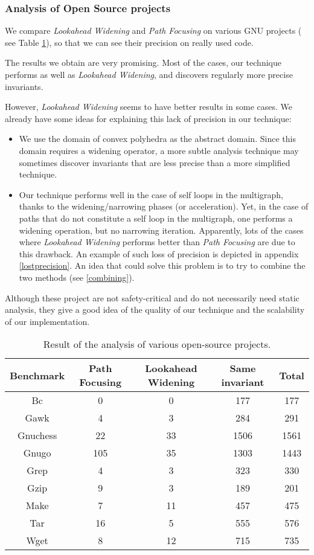 \documentclass[a4paper,english,titlepage,11pt]{report}
\begin{document}
	\subsubsection{Analysis of Open Source projects}

We compare \emph{Lookahead Widening} and \emph{Path Focusing} on various
GNU projects ( see Table \ref{opensource}), so that we can see their precision
on really used code.

The results we obtain are very promising. Most of the cases, our technique
performs as well as \emph{Lookahead Widening}, and discovers regularly more
precise invariants.

However, \emph{Lookahead Widening} seems to have better results in some cases.
We already have some ideas for explaining this lack of precision in our
technique:

\begin{itemize}
\item We use the domain of convex polyhedra as the abstract domain. Since this
domain requires a widening operator, a more subtle analysis technique may
sometimes discover invariants that are less precise than a more simplified
technique.
\item Our technique performs well in the case of self loops in the multigraph,
thanks to the widening/narrowing phases (or acceleration). Yet, in the case of
paths that do not constitute a self loop in the multigraph, one performs a
widening operation, but no narrowing iteration. Apparently, lots of the cases
where \emph{Lookahead Widening} performs better than \emph{Path Focusing} are
due to this drawback. An example of such loss of precision is depicted in
appendix \ref{lostprecision}.
An idea that could solve this problem is to try to combine
the two methods (see \ref{combining}).
\end{itemize}

Although these project are not safety-critical and do not necessarily need
static analysis, they give a good idea of the quality of our technique and the
scalability of our implementation.

\begin{table}
\centering
\begin{tabular}{|c||c|c|c|c|} \hline 
Benchmark & Path Focusing & Lookahead Widening & Same invariant & Total \\
\hline \hline
Bc			& 0 & 0 & 177 & 177 \\ \hline
Gawk		& 4 & 3 & 284 & 291 \\ \hline
Gnuchess	& 22 & 33 & 1506 & 1561 \\ \hline
Gnugo		& 105 & 35 & 1303 & 1443 \\ \hline
Grep		& 4 & 3 & 323 & 330 \\ \hline
Gzip		& 9 & 3 & 189 & 201 \\ \hline
Make		&  7 & 11 & 457 & 475 \\ \hline
Tar			& 16 & 5 & 555 & 576 \\ \hline
Wget		& 8 & 12 & 715 & 735 \\ \hline
\end{tabular}
\caption{Result of the analysis of various open-source projects.}
\label{opensource}
\end{table}
\end{document}
